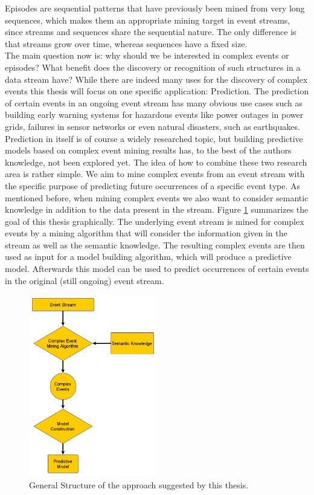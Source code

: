 Episodes are sequential patterns that have previously been mined from very long sequences, which makes them an appropriate mining target in event streams, since streams and sequences share the sequential nature. The only difference is that streams grow over time, whereas sequences have a fixed size.\\
The main question now is: why should we be interested in complex events or episodes? What benefit does the discovery or recognition of such structures in a data stream have? While there are indeed many uses for the discovery of complex events this thesis will focus on one specific application: Prediction. The prediction of certain events in an ongoing event stream has many obvious use cases such as building early warning systems for hazardous events like power outages in power grids, failures in sensor networks or even natural disasters, such as earthquakes. Prediction in itself is of course a widely researched topic, but building predictive models based on complex event mining results has, to the best of the authors knowledge, not been explored yet.
The idea of how to combine these two research area is rather simple. We aim to mine complex events from an event stream with the specific purpose of predicting future occurrences of a specific event type. As mentioned before, when mining complex events we also want to consider semantic knowledge in addition to the data present in the stream. \newline
Figure \ref{fig_approach} summarizes the goal of this thesis graphically. The underlying event stream is mined for complex events by a mining algorithm that will consider the information given in the stream as well as the semantic knowledge. The resulting complex events are then used as input for a model building algorithm, which will produce a predictive model. Afterwards this model can be used to predict occurrences of certain events in the original (still ongoing) event stream.
\begin{figure}[h]
	\centering
  	\includegraphics[width=0.5\textwidth]{approach.jpg}
	\caption{General Structure of the approach suggested by this thesis.}
	\label{fig_approach}
\end{figure}

